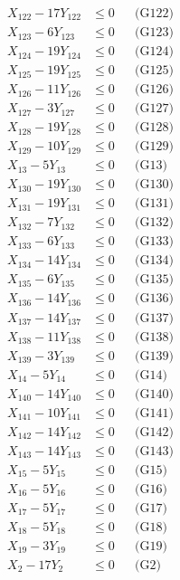 \documentclass[a4paper,10pt]{article}
\begin{document}
{\begin{align}
X_{122} - 17Y_{122} &\leq 0 && \text{(G122)} \\
X_{123} - 6Y_{123} &\leq 0 && \text{(G123)} \\
X_{124} - 19Y_{124} &\leq 0 && \text{(G124)} \\
X_{125} - 19Y_{125} &\leq 0 && \text{(G125)} \\
X_{126} - 11Y_{126} &\leq 0 && \text{(G126)} \\
X_{127} - 3Y_{127} &\leq 0 && \text{(G127)} \\
X_{128} - 19Y_{128} &\leq 0 && \text{(G128)} \\
X_{129} - 10Y_{129} &\leq 0 && \text{(G129)} \\
X_{13} - 5Y_{13} &\leq 0 && \text{(G13)} \\
X_{130} - 19Y_{130} &\leq 0 && \text{(G130)} \\
X_{131} - 19Y_{131} &\leq 0 && \text{(G131)} \\
X_{132} - 7Y_{132} &\leq 0 && \text{(G132)} \\
X_{133} - 6Y_{133} &\leq 0 && \text{(G133)} \\
\allowbreak
X_{134} - 14Y_{134} &\leq 0 && \text{(G134)} \\
X_{135} - 6Y_{135} &\leq 0 && \text{(G135)} \\
X_{136} - 14Y_{136} &\leq 0 && \text{(G136)} \\
X_{137} - 14Y_{137} &\leq 0 && \text{(G137)} \\
X_{138} - 11Y_{138} &\leq 0 && \text{(G138)} \\
X_{139} - 3Y_{139} &\leq 0 && \text{(G139)} \\
X_{14} - 5Y_{14} &\leq 0 && \text{(G14)} \\
X_{140} - 14Y_{140} &\leq 0 && \text{(G140)} \\
X_{141} - 10Y_{141} &\leq 0 && \text{(G141)} \\
X_{142} - 14Y_{142} &\leq 0 && \text{(G142)} \\
X_{143} - 14Y_{143} &\leq 0 && \text{(G143)} \\
X_{15} - 5Y_{15} &\leq 0 && \text{(G15)} \\
X_{16} - 5Y_{16} &\leq 0 && \text{(G16)} \\
X_{17} - 5Y_{17} &\leq 0 && \text{(G17)} \\
X_{18} - 5Y_{18} &\leq 0 && \text{(G18)} \\
X_{19} - 3Y_{19} &\leq 0 && \text{(G19)} \\
X_{2} - 17Y_{2} &\leq 0 && \text{(G2)} \\

\end{align}}
\end{document}
